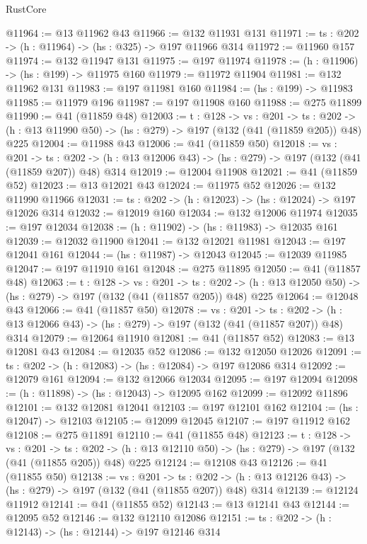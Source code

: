\begin{lexlean}{RustCore}
\begin{coremodule}
@11964 := @13 @11962 @43
@11966 := @132 @11931 @131
@11971 := {ts : @202} -> (h : @11964) -> (hs : @325) -> @197 @11966 @314
@11972 := @11960 @157
@11974 := @132 @11947 @131
@11975 := @197 @11974
@11978 := (h : @11906) -> (hs : @199) -> @11975 @160
@11979 := @11972 @11904
@11981 := @132 @11962 @131
@11983 := @197 @11981 @160
@11984 := (hs : @199) -> @11983
@11985 := @11979 @196
@11987 := @197 @11908 @160
@11988 := @275 @11899
@11990 := @41 (@11859 @48)
@12003 := {t : @128} ->
  {vs : @201} ->
  {ts : @202} -> (h : @13 @11990 @50) -> (hs : @279) -> @197 (@132 (@41 (@11859 @205)) @48) @225
@12004 := @11988 @43
@12006 := @41 (@11859 @50)
@12018 := {vs : @201} ->
  {ts : @202} -> (h : @13 @12006 @43) -> (hs : @279) -> @197 (@132 (@41 (@11859 @207)) @48) @314
@12019 := @12004 @11908
@12021 := @41 (@11859 @52)
@12023 := @13 @12021 @43
@12024 := @11975 @52
@12026 := @132 @11990 @11966
@12031 := {ts : @202} -> (h : @12023) -> (hs : @12024) -> @197 @12026 @314
@12032 := @12019 @160
@12034 := @132 @12006 @11974
@12035 := @197 @12034
@12038 := (h : @11902) -> (hs : @11983) -> @12035 @161
@12039 := @12032 @11900
@12041 := @132 @12021 @11981
@12043 := @197 @12041 @161
@12044 := (hs : @11987) -> @12043
@12045 := @12039 @11985
@12047 := @197 @11910 @161
@12048 := @275 @11895
@12050 := @41 (@11857 @48)
@12063 := {t : @128} ->
  {vs : @201} ->
  {ts : @202} -> (h : @13 @12050 @50) -> (hs : @279) -> @197 (@132 (@41 (@11857 @205)) @48) @225
@12064 := @12048 @43
@12066 := @41 (@11857 @50)
@12078 := {vs : @201} ->
  {ts : @202} -> (h : @13 @12066 @43) -> (hs : @279) -> @197 (@132 (@41 (@11857 @207)) @48) @314
@12079 := @12064 @11910
@12081 := @41 (@11857 @52)
@12083 := @13 @12081 @43
@12084 := @12035 @52
@12086 := @132 @12050 @12026
@12091 := {ts : @202} -> (h : @12083) -> (hs : @12084) -> @197 @12086 @314
@12092 := @12079 @161
@12094 := @132 @12066 @12034
@12095 := @197 @12094
@12098 := (h : @11898) -> (hs : @12043) -> @12095 @162
@12099 := @12092 @11896
@12101 := @132 @12081 @12041
@12103 := @197 @12101 @162
@12104 := (hs : @12047) -> @12103
@12105 := @12099 @12045
@12107 := @197 @11912 @162
@12108 := @275 @11891
@12110 := @41 (@11855 @48)
@12123 := {t : @128} ->
  {vs : @201} ->
  {ts : @202} -> (h : @13 @12110 @50) -> (hs : @279) -> @197 (@132 (@41 (@11855 @205)) @48) @225
@12124 := @12108 @43
@12126 := @41 (@11855 @50)
@12138 := {vs : @201} ->
  {ts : @202} -> (h : @13 @12126 @43) -> (hs : @279) -> @197 (@132 (@41 (@11855 @207)) @48) @314
@12139 := @12124 @11912
@12141 := @41 (@11855 @52)
@12143 := @13 @12141 @43
@12144 := @12095 @52
@12146 := @132 @12110 @12086
@12151 := {ts : @202} -> (h : @12143) -> (hs : @12144) -> @197 @12146 @314

\end{coremodule}
\end{lexlean}
